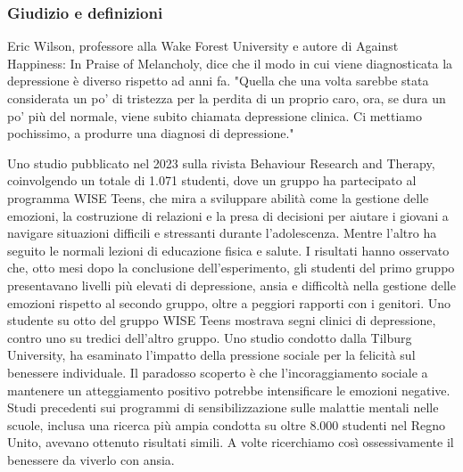 \documentclass[12pt]{book} %
\begin{document}
\subsubsection{Giudizio e definizioni}
Eric Wilson, professore alla Wake Forest University e autore di Against Happiness: In Praise of Melancholy, dice che il
modo in cui viene diagnosticata la depressione è diverso rispetto ad anni fa. "Quella che una volta
sarebbe stata considerata un po' di tristezza per la perdita di un proprio caro, ora, se dura un po' più del normale,
viene subito chiamata depressione clinica. Ci mettiamo pochissimo, a produrre una diagnosi di
depressione."

Uno studio pubblicato nel 2023 sulla rivista Behaviour Research and Therapy, coinvolgendo un totale di 1.071 studenti, dove un gruppo ha partecipato al programma WISE Teens, che mira a sviluppare abilità come la gestione delle emozioni, la costruzione di relazioni e la presa di decisioni per aiutare i giovani a navigare situazioni difficili e stressanti durante l’adolescenza. Mentre l’altro ha seguito le normali lezioni di educazione fisica e salute. I risultati hanno osservato che, otto mesi dopo la conclusione dell’esperimento, gli studenti del primo gruppo presentavano livelli più elevati di depressione, ansia e difficoltà nella gestione delle emozioni rispetto al secondo gruppo, oltre a peggiori rapporti con i genitori. Uno studente su otto del gruppo WISE Teens mostrava segni clinici di depressione, contro uno su tredici dell’altro gruppo.
Uno studio condotto dalla Tilburg University, ha esaminato l’impatto della pressione sociale per la felicità sul benessere individuale. Il paradosso scoperto è che l’incoraggiamento sociale a mantenere un atteggiamento positivo potrebbe intensificare le emozioni negative. Studi precedenti sui programmi di sensibilizzazione sulle malattie mentali nelle scuole, inclusa una ricerca più ampia condotta su oltre 8.000 studenti nel Regno Unito, avevano ottenuto risultati simili.
A volte ricerchiamo così ossessivamente il benessere da viverlo con ansia.
\end{document}
